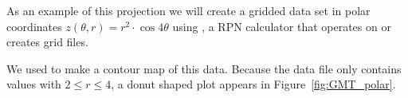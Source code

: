 As an example of this projection we will create a gridded data set
in polar coordinates $z(\theta, r) = r^2 \cdot \cos{4\theta}$
using , a RPN calculator that operates on or
creates grid files.


We used  to make a contour map of this data.  Because
the data file only contains values with $2 \leq r \leq 4$, a donut
shaped plot appears in Figure~\ref{fig:GMT_polar}.\
